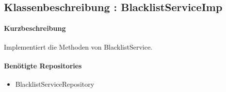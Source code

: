 \subsection*{Klassenbeschreibung : BlacklistServiceImp}%
\paragraph*{Kurzbeschreibung}
Implementiert die Methoden von BlacklistService.
\paragraph*{Benötigte Repositories}
\begin{itemize}
    \item BlacklistServiceRepository
\end{itemize}